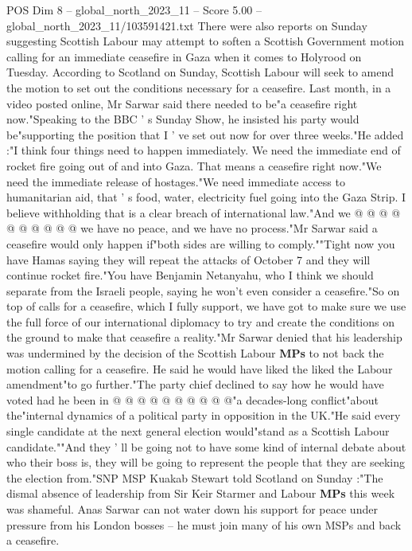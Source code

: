 \begin{textsample}{POS Dim 8 – global\_north\_2023\_11 – Score 5.00 – global\_north\_2023\_11/103591421.txt}  \label{ex:f8_pos_184}
There were also reports on Sunday suggesting Scottish Labour may attempt to soften a Scottish Government motion calling for an immediate ceasefire in Gaza when it comes to Holyrood on Tuesday.
According to Scotland on Sunday, Scottish Labour will seek to amend the motion to set out the conditions necessary for a ceasefire.
Last month, in a video posted online, Mr Sarwar said there needed to be"a ceasefire right now."Speaking to the BBC ' s Sunday Show, he insisted his party would be"supporting the position that I ' ve set out now for over three weeks."He added :"I think four things need to happen immediately.
We need the immediate end of rocket fire going out of and into Gaza.
That means a ceasefire right now."We need the immediate release of hostages."We need immediate access to humanitarian aid, that ' s food, water, electricity fuel going into the Gaza Strip.
I believe withholding that is a clear breach of international law."And we @ @ @ @ @ @ @ @ @ @ we have no peace, and we have no process."Mr Sarwar said a ceasefire would only happen if"both sides are willing to comply.""Tight now you have Hamas saying they will repeat the attacks of October 7 and they will continue rocket fire."You have Benjamin Netanyahu, who I think we should separate from the Israeli people, saying he won't even consider a ceasefire."So on top of calls for a ceasefire, which I fully support, we have got to make sure we use the full force of our international diplomacy to try and create the conditions on the ground to make that ceasefire a reality."Mr Sarwar denied that his leadership was undermined by the decision of the Scottish Labour \textbf{MPs} to not back the motion calling for a ceasefire.
He said he would have liked the liked the Labour amendment"to go further."The party chief declined to say how he would have voted had he been in @ @ @ @ @ @ @ @ @ @"a decades-long conflict"about the"internal dynamics of a political party in opposition in the UK."He said every single candidate at the next general election would"stand as a Scottish Labour candidate.""And they ' ll be going not to have some kind of internal debate about who their boss is, they will be going to represent the people that they are seeking the election from."SNP MSP Kuakab Stewart told Scotland on Sunday :"The dismal absence of leadership from Sir Keir Starmer and Labour \textbf{MPs} this week was shameful.
Anas Sarwar can not water down his support for peace under pressure from his London bosses -- he must join many of his own MSPs and back a ceasefire.

\end{textsample}
